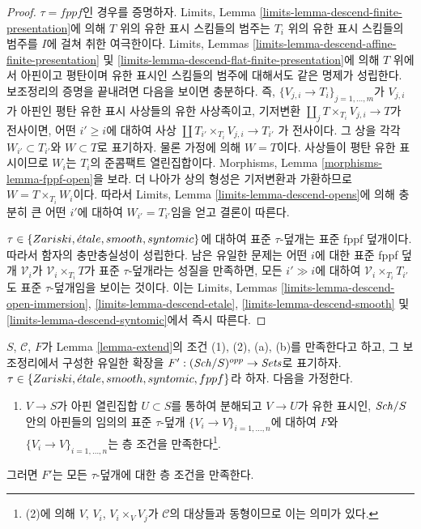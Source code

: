 \begin{proof}
$\tau = fppf$인 경우를 증명하자. Limits, Lemma
\ref{limits-lemma-descend-finite-presentation}에 의해 $T$ 위의 유한 표시
스킴들의 범주는 $T_i$ 위의 유한 표시 스킴들의 범주를 $I$에 걸쳐 취한
여극한이다. Limits, Lemmas
\ref{limits-lemma-descend-affine-finite-presentation} 및
\ref{limits-lemma-descend-flat-finite-presentation}에 의해 $T$ 위에서 아핀이고
평탄이며 유한 표시인 스킴들의 범주에 대해서도 같은 명제가 성립한다.
보조정리의 증명을 끝내려면 다음을 보이면 충분하다. 즉,
$\{V_{j, i} \to T_i\}_{j = 1, \ldots, m}$가 $V_{j, i}$가 아핀인 평탄 유한
표시 사상들의 유한 사상족이고, 기저변환
$\coprod_j T \times_{T_i} V_{j, i} \to T$가 전사이면, 어떤
$i' \geq i$에 대하여 사상
$\coprod T_{i'} \times_{T_i} V_{j, i} \to T_{i'}$
가 전사이다. 그 상을 각각 $W_{i'} \subset T_{i'}$와 $W \subset T$로
표기하자. 물론 가정에 의해 $W = T$이다. 사상들이 평탄 유한 표시이므로
$W_i$는 $T_i$의 준콤팩트 열린집합이다. Morphisms, Lemma
\ref{morphisms-lemma-fppf-open}을 보라. 더 나아가 상의 형성은 기저변환과
가환하므로 $W = T \times_{T_i} W_i$이다. 따라서 Limits, Lemma
\ref{limits-lemma-descend-opens}에 의해 충분히 큰 어떤 $i'$에 대하여
$W_{i'} = T_{i'}$임을 얻고 결론이 따른다.

\medskip\noindent
$\tau \in \{Zariski, {\acute{e}tale}, smooth, syntomic\}$에 대하여 표준
$\tau$-덮개는 표준 fppf 덮개이다. 따라서 함자의 충만충실성이 성립한다.
남은 유일한 문제는 어떤 $i$에 대한 표준 fppf 덮개 $\mathcal{V}_i$가
$\mathcal{V}_i \times_{T_i} T$가 표준 $\tau$-덮개라는 성질을 만족하면,
모든 $i' \gg i$에 대하여 $\mathcal{V}_i \times_{T_i} T_{i'}$도 표준
$\tau$-덮개임을 보이는 것이다. 이는 Limits, Lemmas
\ref{limits-lemma-descend-open-immersion},
\ref{limits-lemma-descend-etale},
\ref{limits-lemma-descend-smooth} 및
\ref{limits-lemma-descend-syntomic}에서 즉시 따른다.
\end{proof}

\begin{lemma}
\label{lemma-extend-sheaf-general}
$S$, $\mathcal{C}$, $F$가 Lemma \ref{lemma-extend}의 조건 (1), (2), (a),
(b)를 만족한다고 하고, 그 보조정리에서 구성한 유일한 확장을
$F' : (\mathit{Sch}/S)^{opp} \to \textit{Sets}$로 표기하자.
$\tau \in \{Zariski, {\acute{e}tale}, smooth, syntomic, fppf\}$라 하자. 다음을
가정한다.
\begin{enumerate}
\item[(c)] $V \to S$가 아핀 열린집합 $U \subset S$를 통하여 분해되고
$V \to U$가 유한 표시인, $\mathit{Sch}/S$ 안의 아핀들의 임의의 표준 $\tau$-덮개
$\{V_i \to V\}_{i = 1, \ldots, n}$에 대하여 $F$와
$\{V_i \to V\}_{i = 1, \ldots, n}$는 층 조건을 만족한다\footnote{(2)에
의해 $V$, $V_i$, $V_i \times_V V_j$가 $\mathcal{C}$의 대상들과
동형이므로 이는 의미가 있다.}.
\end{enumerate}
그러면 $F'$는 모든 $\tau$-덮개에 대한 층 조건을 만족한다.
\end{lemma}

